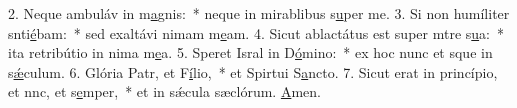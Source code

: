 2. Neque ambuláv in m\uline{a}gnis:~* neque in mirablibus s\uline{u}per me.
3. Si non humíliter snti\uline{é}bam:~* sed exaltávi nimam m\uline{e}am.
4. Sicut ablactátus est super mtre s\uline{u}a:~* ita retribútio in nima m\uline{e}a.
5. Speret Isral in D\uline{ó}mino:~* ex hoc nunc et sque in s\uline{ǽ}culum.
6. Glória Patr, et F\uline{í}lio,~* et Spirtui S\uline{a}ncto.
7. Sicut erat in princípio, et nnc, et s\uline{e}mper,~* et in sǽcula sæclórum. \uline{A}men.
